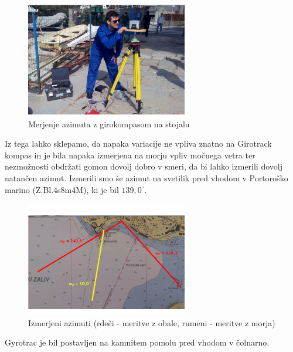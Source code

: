 \begin{figure}
	\centering
	\includegraphics[height=5cm]{Vaje/VzorecPoroc/figs/Aleks_Gyro.pdf}
	\caption{Merjenje azimuta z girokompasom na stojalu}
	\label{fig:Aleks_meri}       %
\end{figure}


Iz tega lahko sklepamo, da napaka variacije ne vpliva znatno na Girotrack kompas in je bila napaka izmerjena na morju vpliv močnega vetra ter nezmožnosti obdržati gomon dovolj dobro v smeri, da bi lahko izmerili dovolj natančen azimut. Izmerili smo še azimut na svetilik pred vhodom v Portoroško marino (Z.Bl.4s8m4M), ki je bil $139,0^{\circ}$.

\begin{figure}
	\centering
	\includegraphics[height=5cm]{Vaje/VzorecPoroc/figs/Karta_Azimuti.pdf}
	\caption{Izmerjeni azimuti (rdeči - meritve z obale, rumeni - meritve z morja)}
	\label{fig:Karta_IzmerAzimuti}       %
\end{figure}


Gyrotrac je bil postavljen na kamnitem pomolu pred vhodom v čolnarno.

